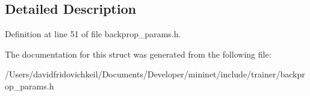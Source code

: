 \subsection{Detailed Description}


Definition at line 51 of file backprop\+\_\+params.\+h.



The documentation for this struct was generated from the following file\+:\begin{DoxyCompactItemize}
\item 
/\+Users/davidfridovichkeil/\+Documents/\+Developer/mininet/include/trainer/backprop\+\_\+params.\+h\end{DoxyCompactItemize}
